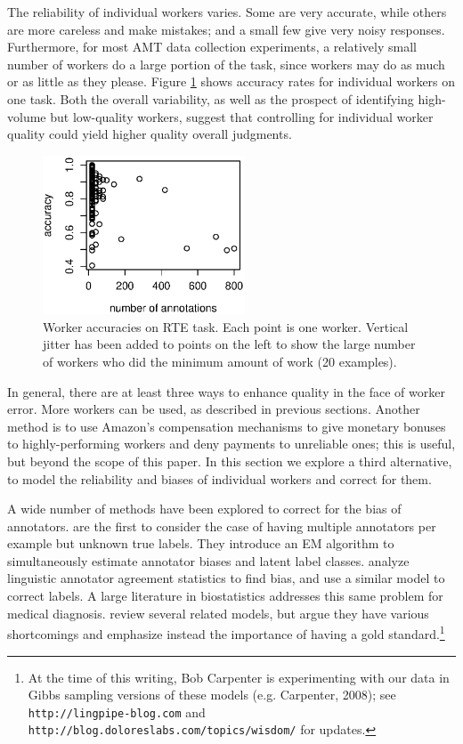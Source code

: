 \documentclass[11pt]{article}
\begin{document}
The reliability of individual workers varies.  Some are very accurate, while others are more careless and make mistakes; and a small few give very noisy responses.  Furthermore, for most AMT data collection experiments, a relatively small number of workers do a large portion of the task, since workers may do as much or as little as they please.  Figure \ref{Workers} shows accuracy rates for individual workers on one task.  Both the overall variability, as well as the prospect of identifying high-volume but low-quality workers, suggest that controlling for individual worker quality could yield higher quality overall judgments.

\begin{figure}[t]
\centering
\includegraphics[width=6cm]{figures/workers.eps}
\caption{Worker accuracies on RTE task.  Each point is one worker.  Vertical jitter has been added to points on the left to show the large number of workers who did the minimum amount of work (20 examples).} \label{Workers}
\end{figure}
In general, there are at least three ways to enhance quality in the face of worker error.  More workers can be used, as described in previous sections.  
Another method is to use Amazon's compensation mechanisms to give monetary bonuses to highly-performing workers and deny payments to unreliable ones; this is useful, but beyond the scope of this paper.  In this section we explore a third alternative, to model the reliability and biases of individual workers and correct for them.

A wide number of methods have been explored to correct for the bias of annotators.   are the first to consider the case of having multiple annotators per example but unknown true labels.  They introduce an EM algorithm to simultaneously estimate annotator biases and latent label classes.   analyze linguistic annotator agreement statistics to find bias, and use a similar model to correct labels.  A large literature in biostatistics addresses this same problem for medical diagnosis.   review several related models, but argue they have various shortcomings and emphasize instead the importance of having a gold standard.\footnote{At the time of this writing, Bob Carpenter is experimenting with our data in Gibbs sampling versions of these models (e.g. Carpenter, 2008); see \texttt{\scriptsize{http://lingpipe-blog.com}} and \texttt{\scriptsize{http://blog.doloreslabs.com/topics/wisdom/}} for updates.}
\end{document}
